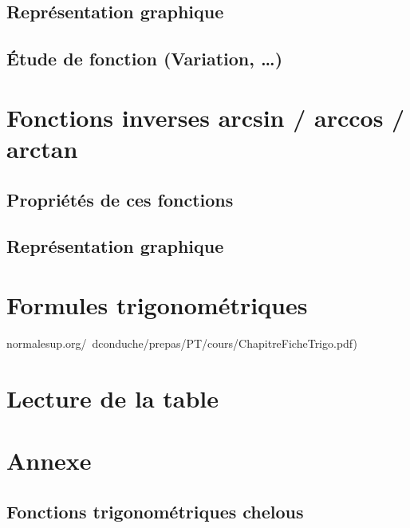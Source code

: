 \documentclass[a4paper]{article}
\begin{document}
		\subsection{Représentation graphique}

		\subsection{Étude de fonction (Variation, …)}

	\section{Fonctions inverses arcsin / arccos / arctan}

		\subsection{Propriétés de ces fonctions}

		\subsection{Représentation graphique}

	\section{Formules trigonométriques}

		normalesup.org/~dconduche/prepas/PT/cours/ChapitreFicheTrigo.pdf)

	\section{Lecture de la table}

	\section{Annexe}

		\subsection*{Fonctions trigonométriques chelous} \label{fonction_trigo_chelous}
\end{document}
